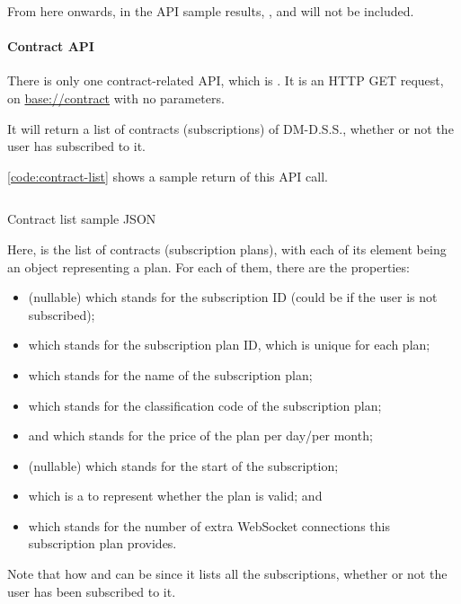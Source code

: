 From here onwards, in the API sample results, ,  and  will not be included.

\paragraph{Contract API}

There is only one contract-related API, which is . It is an HTTP GET request, on \url{base://contract} with no parameters.

It will return a list of contracts (subscriptions) of DM-D.S.S., whether or not the user has subscribed to it.

\autoref{code:contract-list} shows a sample return of this API call.
\begin{listing}[htp]
    \inputminted{json}{code/ContractList.json}
    \caption{Contract list sample JSON}
    \label{code:contract-list}
\end{listing}

Here,  is the list of contracts (subscription plans), with each of its element being an object representing a plan. For each of them, there are the properties:
\begin{itemize}
    \item {} (nullable) which stands for the subscription ID (could be  if the user is not subscribed);
    \item {} which stands for the subscription plan ID, which is unique for each plan;
    \item {} which stands for the name of the subscription plan;
    \item {} which stands for the classification code of the subscription plan;
    \item {} and  which stands for the price of the plan per day/per month;
    \item {} (nullable) which stands for the start of the subscription;
    \item {} which is a  to represent whether the plan is valid; and
    \item {} which stands for the number of extra WebSocket connections this subscription plan provides.
\end{itemize}

Note that how  and  can be  since it lists all the subscriptions, whether or not the user has been subscribed to it.

